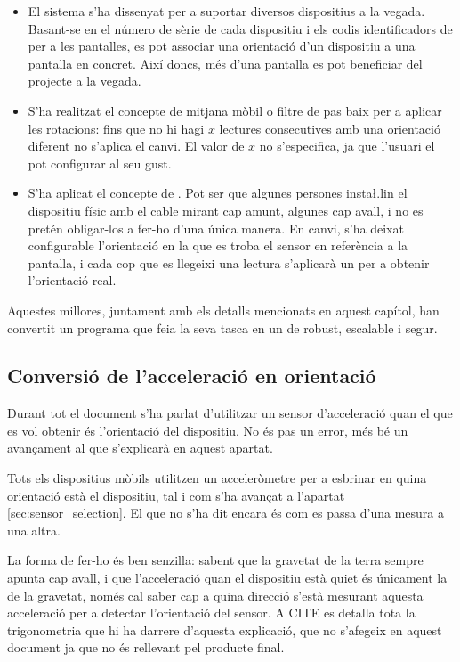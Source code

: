 \begin{itemize}
    \item El sistema s'ha dissenyat per a suportar diversos dispositius a la
    vegada. Basant-se en el número de sèrie de cada dispositiu i els codis
    identificadors de  per a les pantalles, es pot associar una
    orientació d'un dispositiu a una pantalla en concret. Així doncs, més
    d'una pantalla es pot beneficiar del projecte a la vegada.
    \item S'ha realitzat el concepte de mitjana mòbil o filtre de pas baix per
    a aplicar les rotacions: fins que no hi hagi $x$ lectures consecutives amb
    una orientació diferent no s'aplica el canvi. El valor de $x$ no
    s'especifica, ja que l'usuari el pot configurar al seu gust.
    \item S'ha aplicat el concepte de . Pot ser que algunes persones
    insta\l.lin el dispositiu físic amb el cable mirant cap amunt, algunes cap
    avall, i no es pretén obligar-los a fer-ho d'una única manera. En canvi,
    s'ha deixat configurable l'orientació en la que es troba el sensor en
    referència a la pantalla, i cada cop que es llegeixi una lectura s'aplicarà
    un  per a obtenir l'orientació real.
\end{itemize}

Aquestes millores, juntament amb els detalls mencionats en aquest capítol, han
convertit un programa que feia la seva tasca en un de robust, escalable i segur.

\subsection{Conversió de l'acceleració en orientació}

Durant tot el document s'ha parlat d'utilitzar un sensor d'acceleració quan el
que es vol obtenir és l'orientació del dispositiu. No és pas un error, més bé
un avançament al que s'explicarà en aquest apartat.

Tots els dispositius mòbils utilitzen un acceleròmetre per a esbrinar en quina
orientació està el dispositiu, tal i com s'ha avançat a l'apartat
\ref{sec:sensor_selection}. El que no s'ha dit encara és com es passa d'una
mesura a una altra.

La forma de fer-ho és ben senzilla: sabent que la gravetat de la terra sempre
apunta cap avall, i que l'acceleració quan el dispositiu està quiet és únicament
la de la gravetat, només cal saber cap a quina direcció s'està mesurant aquesta
acceleració per a detectar l'orientació del sensor. A CITE es detalla tota la
trigonometria que hi ha darrere d'aquesta explicació, que no s'afegeix en aquest
document ja que no és rellevant pel producte final.

